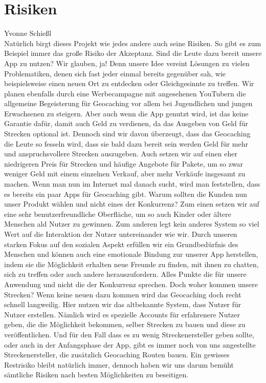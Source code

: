 \documentclass[a4paper, 12pt]{article}
\begin{document}
\section{Risiken}Yvonne Schießl\\
Natürlich birgt dieses Projekt wie jedes andere auch seine Risiken.\newline
So gibt es zum Beispiel immer das große Risiko der Akzeptanz. Sind die Leute dazu bereit unsere App zu nutzen? Wir glauben, ja! Denn unsere Idee vereint Lösungen zu vielen Problematiken, denen sich fast jeder einmal bereits gegenüber sah, wie beispielsweise einen neuen Ort zu entdecken oder Gleichgesinnte zu treffen. Wir planen ebenfalls durch eine Werbecampagne mit angesehenen YouTubern die allgemeine Begeisterung für Geocaching vor allem bei Jugendlichen und jungen Erwachsenen zu steigern.\newline
Aber auch wenn die App genutzt wird, ist das keine Garantie dafür, damit auch Geld zu verdienen, da das Ausgeben von Geld für Strecken optional ist. Dennoch sind wir davon überzeugt, dass das Geocaching die Leute so fesseln wird, dass sie bald dazu bereit sein werden Geld für mehr und anspruchsvollere Strecken auszugeben. Auch setzen wir auf einen eher niedrigeren Preis für Strecken und häufige Angebote für Pakete, um so zwar weniger Geld mit einem einzelnen Verkauf, aber mehr Verkäufe insgesamt zu machen.\newline
Wenn man nun im Internet mal danach sucht, wird man feststellen, dass es bereits ein paar Apps für Geocaching gibt. Warum sollten die Kunden nun unser Produkt wählen und nicht eines der Konkurrenz? Zum einen setzen wir auf eine sehr benutzerfreundliche Oberfläche, um so auch Kinder oder ältere Menschen ald Nutzer zu gewinnen. Zum anderen legt kein anderes System so viel Wert auf die Interaktion der Nutzer untereinander wie wir. Durch unseren starken Fokus auf den sozialen Aspekt erfüllen wir ein Grundbedürfnis des Menschen und können auch eine emotionale Bindung zur unserer App herstellen, indem sie die Möglichkeit erhalten neue Freunde zu finden, mit ihnen zu chatten, sich zu treffen oder auch andere herauszufordern. Alles Punkte die für unsere Anwendung und nicht die der Konkurrenz sprechen.\newline
Doch woher kommen unsere Strecken? Wenn keine neuen dazu kommen wird das Geocaching doch recht schnell langweilig. Hier nutzen wir das altbekannte System, dass Nutzer für Nutzer erstellen. Nämlich wird es spezielle Accounts für erfahrenere Nutzer geben, die die Möglichkeit bekommen, selber Strecken zu bauen und diese zu veröffentlichen. Und für den Fall dass es zu wenig Streckenersteller geben sollte, oder auch in der Anfangsphase der App, gibt es immer noch von uns angestellte Streckenersteller, die zusätzlich Geocaching Routen bauen.\newline
Ein gewisses Restrisiko bleibt natürlich immer, dennoch haben wir uns darum bemüht sämtliche Risiken nach besten Möglichkeiten zu beseitigen.
\end{document}
